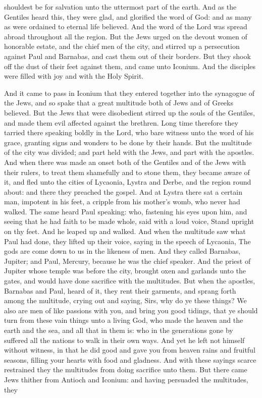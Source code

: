 shouldest be for salvation unto the uttermost part of the earth.  And as the Gentiles heard this, they were glad, and glorified the word of God: and as many as were ordained to eternal life believed. And the word of the Lord was spread abroad throughout all the region. But the Jews urged on the devout women of honorable estate, and the chief men of the city, and stirred up a persecution against Paul and Barnabas, and cast them out of their borders. But they shook off the dust of their feet against them, and came unto Iconium. And the disciples were filled with joy and with the Holy Spirit. 

And it came to pass in Iconium that they entered together into the synagogue of the Jews, and so spake that a great multitude both of Jews and of Greeks believed. But the Jews that were disobedient stirred up the souls of the Gentiles, and made them evil affected against the brethren. Long time therefore they tarried there speaking boldly in the Lord, who bare witness unto the word of his grace, granting signs and wonders to be done by their hands. But the multitude of the city was divided; and part held with the Jews, and part with the apostles. And when there was made an onset both of the Gentiles and of the Jews with their rulers, to treat them shamefully and to stone them, they became aware of it, and fled unto the cities of Lycaonia, Lystra and Derbe, and the region round about: and there they preached the gospel.  And at Lystra there sat a certain man, impotent in his feet, a cripple from his mother’s womb, who never had walked. The same heard Paul speaking: who, fastening his eyes upon him, and seeing that he had faith to be made whole, said with a loud voice, Stand upright on thy feet. And he leaped up and walked. And when the multitude saw what Paul had done, they lifted up their voice, saying in the speech of Lycaonia, The gods are come down to us in the likeness of men. And they called Barnabas, Jupiter; and Paul, Mercury, because he was the chief speaker. And the priest of Jupiter whose temple was before the city, brought oxen and garlands unto the gates, and would have done sacrifice with the multitudes. But when the apostles, Barnabas and Paul, heard of it, they rent their garments, and sprang forth among the multitude, crying out and saying, Sirs, why do ye these things? We also are men of like passions with you, and bring you good tidings, that ye should turn from these vain things unto a living God, who made the heaven and the earth and the sea, and all that in them is: who in the generations gone by suffered all the nations to walk in their own ways. And yet he left not himself without witness, in that he did good and gave you from heaven rains and fruitful seasons, filling your hearts with food and gladness. And with these sayings scarce restrained they the multitudes from doing sacrifice unto them.  But there came Jews thither from Antioch and Iconium: and having persuaded the multitudes, they 